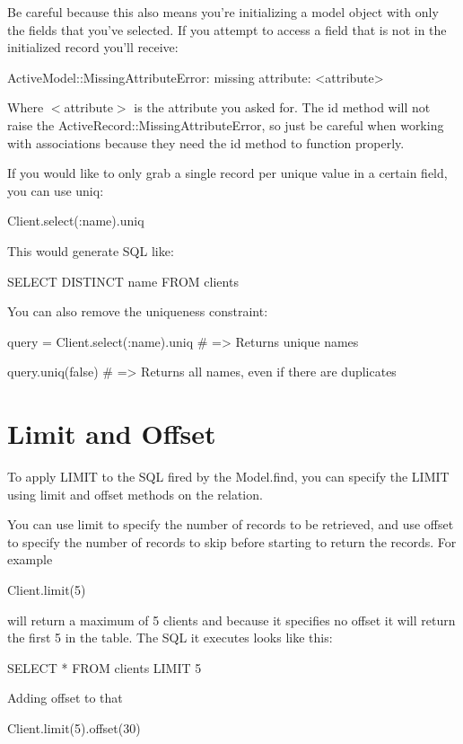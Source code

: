 \documentclass[10pt]{book}
\newenvironment{code}{%
  \scriptsize
    \verbatim
}{%
    \endverbatim
    \newline
}
\begin{document}
Be careful because this also means you’re initializing a model object  with only the fields that you’ve selected. If you attempt to access a  field that is not in the initialized record you’ll receive:
\begin{code}
ActiveModel::MissingAttributeError: missing attribute: <attribute>
\end{code}

Where $<$attribute$>$ is the attribute you asked for. The id method will not raise the ActiveRecord::MissingAttributeError, so just be careful when working with associations because they need the id method to function properly.

If you would like to only grab a single record per unique value in a certain field, you can use uniq:
\begin{code}
Client.select(:name).uniq
\end{code}

This would generate SQL like:
\begin{code}
SELECT DISTINCT name FROM clients
\end{code}

You can also remove the uniqueness constraint:
\begin{code}
query = Client.select(:name).uniq
# => Returns unique names
 
query.uniq(false)
# => Returns all names, even if there are duplicates
\end{code}

\section{ Limit and Offset}

To apply LIMIT to the SQL fired by the Model.find, you can specify the LIMIT using limit and offset methods on the relation.

You can use limit to specify the number of records to be retrieved, and use offset to specify the number of records to skip before starting to return the records. For example
\begin{code}
Client.limit(5)
\end{code}

will return a maximum of 5 clients and because it specifies no offset it will return the first 5 in the table. The SQL it executes looks like this:
\begin{code}
SELECT * FROM clients LIMIT 5
\end{code}

Adding offset to that
\begin{code}
Client.limit(5).offset(30)
\end{code}
\end{document}
